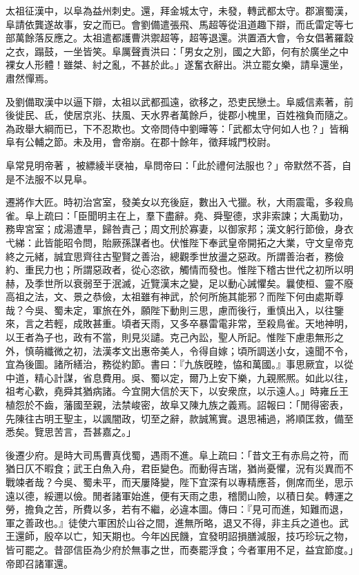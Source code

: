 \begin{pinyinscope}
太祖征漢中，以阜為益州刺史。還，拜金城太守，未發，轉武都太守。郡濵蜀漢，阜請依龔遂故事，安之而已。會劉備遣張飛、馬超等從沮道趣下辯，而氐雷定等七部萬餘落反應之。太祖遣都護曹洪禦超等，超等退還。洪置酒大會，令女倡著羅縠之衣，蹋鼓，一坐皆笑。阜厲聲責洪曰：「男女之別，國之大節，何有於廣坐之中裸女人形體！雖桀、紂之亂，不甚於此。」遂奮衣辭出。洪立罷女樂，請阜還坐，肅然憚焉。

及劉備取漢中以逼下辯，太祖以武都孤遠，欲移之，恐吏民戀土。阜威信素著，前後徙民、氐，使居京兆、扶風、天水界者萬餘戶，徙郡小槐里，百姓襁負而隨之。為政舉大綱而已，下不忍欺也。文帝問侍中劉曄等：「武都太守何如人也？」皆稱阜有公輔之節。未及用，會帝崩。在郡十餘年，徵拜城門校尉。

阜常見明帝著𧛕，被縹綾半裦袖，阜問帝曰：「此於禮何法服也？」帝默然不荅，自是不法服不以見阜。

遷將作大匠。時初治宮室，發美女以充後庭，數出入弋獵。秋，大雨震電，多殺鳥雀。阜上疏曰：「臣聞明主在上，羣下盡辭。堯、舜聖德，求非索諫；大禹勤功，務卑宮室；成湯遭旱，歸咎責己；周文刑於寡妻，以御家邦；漢文躬行節儉，身衣弋綈：此皆能昭令問，貽厥孫謀者也。伏惟陛下奉武皇帝開拓之大業，守文皇帝克終之元緒，誠宜思齊往古聖賢之善治，總觀季世放盪之惡政。所謂善治者，務儉約、重民力也；所謂惡政者，從心恣欲，觸情而發也。惟陛下稽古世代之初所以明赫，及季世所以衰弱至于泯滅，近覽漢末之變，足以動心誡懼矣。曩使桓、靈不廢高祖之法，文、景之恭儉，太祖雖有神武，於何所施其能邪？而陛下何由處斯尊哉？今吳、蜀未定，軍旅在外，願陛下動則三思，慮而後行，重慎出入，以往鑒來，言之若輕，成敗甚重。頃者天雨，又多卒暴雷電非常，至殺鳥雀。天地神明，以王者為子也，政有不當，則見災譴。克己內訟，聖人所記。惟陛下慮患無形之外，慎萌纖微之初，法漢孝文出惠帝美人，令得自嫁；頃所調送小女，遠聞不令，宜為後圖。諸所繕治，務從約節。書曰：『九族旣睦，恊和萬國。』事思厥宜，以從中道，精心計謀，省息費用。吳、蜀以定，爾乃上安下樂，九親熈熈。如此以往，祖考心歡，堯舜其猶病諸。今宜開大信於天下，以安衆庶，以示遠人。」時雍丘王植怨於不齒，藩國至親，法禁峻密，故阜又陳九族之義焉。詔報曰：「閒得密表，先陳往古明王聖主，以諷闇政，切至之辭，款誠篤實。退思補過，將順匡救，備至悉矣。覽思苦言，吾甚嘉之。」

後遷少府。是時大司馬曹真伐蜀，遇雨不進。阜上疏曰：「昔文王有赤烏之符，而猶日仄不暇食；武王白魚入舟，君臣變色。而動得吉瑞，猶尚憂懼，況有災異而不戰竦者哉？今吳、蜀未平，而天屢降變，陛下宜深有以專精應荅，側席而坐，思示遠以德，綏邇以儉。閒者諸軍始進，便有天雨之患，稽閡山險，以積日矣。轉運之勞，擔負之苦，所費以多，若有不繼，必違本圖。傳曰：『見可而進，知難而退，軍之善政也。』徒使六軍困於山谷之間，進無所略，退又不得，非主兵之道也。武王還師，殷卒以亡，知天期也。今年凶民饑，宜發明詔損膳減服，技巧珍玩之物，皆可罷之。昔邵信臣為少府於無事之世，而奏罷浮食；今者軍用不足，益宜節度。」帝即召諸軍還。


\end{pinyinscope}
